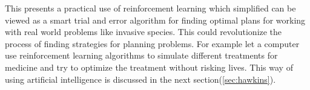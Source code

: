 
This presents a practical use of reinforcement learning which simplified can be viewed as a smart trial and error algorithm for finding optimal plans for working with real world problems like invasive species. This could revolutionize the process of finding strategies for planning problems. For example let a computer use reinforcement learning algorithms to simulate different treatments for medicine and try to optimize the treatment without risking lives. This way of using artificial intelligence is discussed in the next section(\ref{sec:hawkins}).


